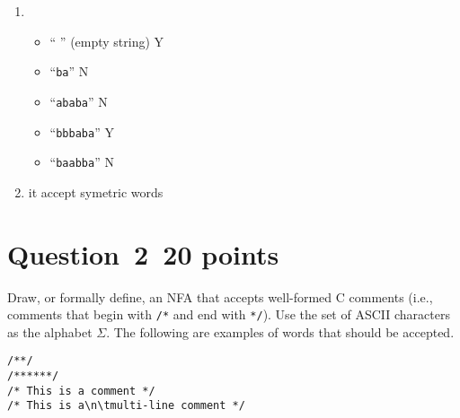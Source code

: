 \documentclass[10pt]{article}
\begin{document}
\begin{framed}
	\begin{enumerate}
	\item
	\begin{itemize}
		\item `` '' (empty string)         Y
		\item ``{\tt ba}''                 N
		\item ``{\tt ababa}''              N
		\item ``{\tt bbbaba}''             Y
		\item ``{\tt baabba}''             N
	\end{itemize}
	\item
		it accept symetric words
\end{enumerate}
\end{framed}

\section*{Question~2~\hfill 20 points}

Draw, or formally define, 
an NFA that accepts well-formed C comments
(i.e., comments that begin with \verb|/*|
and end with \verb|*/|).
Use the set of ASCII characters as the alphabet $\Sigma$.
The following are examples of words that should be accepted.
\begin{verbatim}
/**/
/******/
/* This is a comment */
/* This is a\n\tmulti-line comment */
\end{verbatim}

\begin{framed}
\begin{center}
\end{center}
\end{framed}
\end{document}
